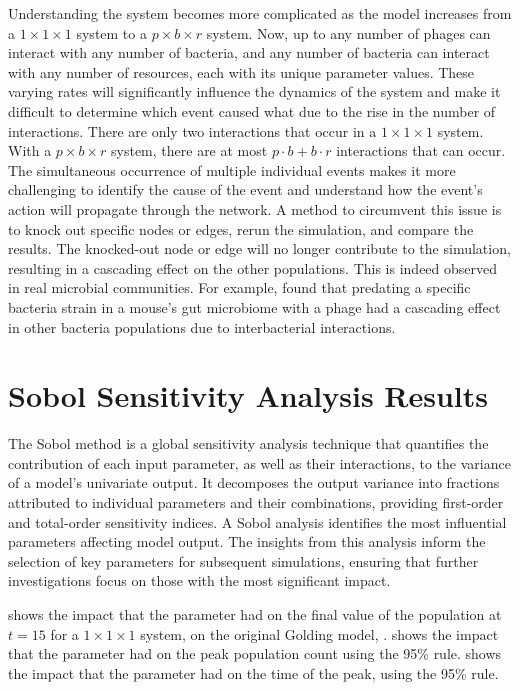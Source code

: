 Understanding the system becomes more complicated as the model increases from a $1\times1\times1$ system to a $p\times b\times r$ system. 
Now, up to any number of phages can interact with any number of bacteria, and any number of bacteria can interact with any number of resources, each with its unique parameter values. 
These varying rates will significantly influence the dynamics of the system and make it difficult to determine which event caused what due to the rise in the number of interactions.
There are only two interactions that occur in a $1\times1\times1$ system. 
With a $p\times b\times r$ system, there are at most $p\cdot b + b\cdot r$ interactions that can occur. 
The simultaneous occurrence of multiple individual events makes it more challenging to identify the cause of the event and understand how the event's action will propagate through the network. 
A method to circumvent this issue is to knock out specific nodes or edges, rerun the simulation, and compare the results. 
The knocked-out node or edge will no longer contribute to the simulation, resulting in a cascading effect on the other populations. 
This is indeed observed in real microbial communities. 
For example, \citet{hsuDynamicModulationGut2019} found that predating a specific bacteria strain in a mouse's gut microbiome with a phage had a cascading effect in other bacteria populations due to interbacterial interactions. 

\section{Sobol Sensitivity Analysis Results}
\label{sec:Sobol_sensitivity_analysis_results}
The Sobol method is a global sensitivity analysis technique that quantifies the contribution of each input parameter, as well as their interactions, to the variance of a model's univariate output. 
It decomposes the output variance into fractions attributed to individual parameters and their combinations, providing first-order and total-order sensitivity indices.
A Sobol analysis identifies the most influential parameters affecting model output. 
The insights from this analysis inform the selection of key parameters for subsequent simulations, ensuring that further investigations focus on those with the most significant impact.

 shows the impact that the parameter had on the final value of the population at $t=15$ for a $1\times 1\times 1$ system, on the original Golding model, . 
 shows the impact that the parameter had on the peak population count using the 95\% rule. 
 shows the impact that the parameter had on the time of the peak, using the 95\% rule. 

